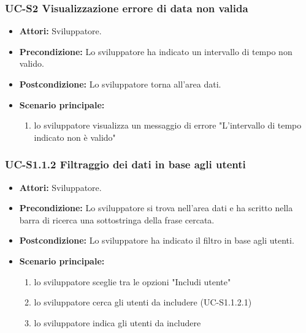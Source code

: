 	\subsubsection{UC-S2 Visualizzazione errore di data non valida}
		\begin{itemize}					
			\item \textbf{Attori:} Sviluppatore.
			\item \textbf{Precondizione:} Lo sviluppatore ha indicato un intervallo di tempo non valido.
			\item \textbf{Postcondizione:} Lo sviluppatore torna all'area dati.
			\item \textbf{Scenario principale:}
				\begin{enumerate}
					\item lo sviluppatore visualizza un messaggio di errore "L'intervallo di tempo indicato non è valido"
				\end{enumerate}	
		\end{itemize}					
						
	\subsubsection{UC-S1.1.2 Filtraggio dei dati in base agli utenti}	
		\begin{itemize}
			\item \textbf{Attori:} Sviluppatore.
			\item \textbf{Precondizione:} Lo sviluppatore si trova nell'area dati e ha scritto nella barra di ricerca una sottostringa della frase cercata.
			\item \textbf{Postcondizione:} Lo sviluppatore ha indicato il filtro in base agli utenti.
			\item \textbf{Scenario principale:}
				\begin{enumerate}
					\item lo sviluppatore sceglie tra le opzioni "Includi utente"
					\item lo sviluppatore cerca gli utenti da includere (UC-S1.1.2.1)
					\item lo sviluppatore indica gli utenti da includere
				\end{enumerate}
		\end{itemize}
		
